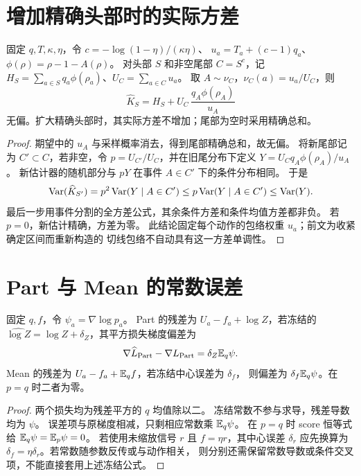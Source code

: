 \section{增加精确头部时的实际方差}
\begin{proposition}[固定包络尾采样的方差单调性]
\label{prop:head-monotone-variance}
固定 $q,T,\kappa,\eta$，令 $c=-\log(1-\eta)/(\kappa\eta)$、
$u_a=T_a+(c-1)q_a$、$\phi(\rho)=\rho-1-A(\rho)$。
对头部 $S$ 和非空尾部 $C=S^c$，记
$H_S=\sum_{a\in S}q_a\phi(\rho_a)$、$U_C=\sum_{a\in C}u_a$。
取 $A\sim\nu_C$，$\nu_C(a)=u_a/U_C$，则
\begin{equation}
\widehat K_S=H_S+U_C\,\frac{q_A\phi(\rho_A)}{u_A}
\end{equation}
无偏。扩大精确头部时，其实际方差不增加；尾部为空时采用精确总和。
\end{proposition}
\begin{proof}
期望中的 $u_A$ 与采样概率消去，得到尾部精确总和，故无偏。
将新尾部记为 $C'\subset C$，若非空，令
$p=U_{C'}/U_C$，并在旧尾分布下定义
$Y=U_Cq_A\phi(\rho_A)/u_A$。
新估计器的随机部分与 $pY$ 在事件 $A\in C'$ 下的条件分布相同。
于是
\begin{equation}
\operatorname{Var}(\widehat K_{S'})
=p^2\operatorname{Var}(Y\mid A\in C')
\le p\operatorname{Var}(Y\mid A\in C')
\le\operatorname{Var}(Y).
\end{equation}
最后一步用事件分割的全方差公式，其余条件方差和条件均值方差都非负。
若 $p=0$，新估计精确，方差为零。
此结论固定每个动作的包络权重 $u_a$；前文为收紧确定区间而重新构造的
切线包络不自动具有这一方差单调性。
\end{proof}

\section{Part 与 Mean 的常数误差}
\begin{proposition}[配分函数及信号中心误差的精确梯度偏差]
\label{prop:part-mean-error}
固定 $q,f$，令 $\psi_a=\nabla\log p_a$。
Part 的残差为 $U_a-f_a+\log Z$，若冻结的
$\widehat{\log Z}=\log Z+\delta_Z$，其平方损失梯度偏差为
\begin{equation}
\nabla\widehat L_{\rm Part}-\nabla L_{\rm Part}
=\delta_Z\mathbb E_q\psi.
\end{equation}
Mean 的残差为 $U_a-f_a+\mathbb E_qf$，若冻结中心误差为 $\delta_f$，
则偏差为 $\delta_f\mathbb E_q\psi$。在 $p=q$ 时二者为零。
\end{proposition}
\begin{proof}
两个损失均为残差平方的 $q$ 均值除以二。
冻结常数不参与求导，残差导数均为 $\psi$。
误差项与原梯度相减，只剩相应常数乘 $\mathbb E_q\psi$。
在 $p=q$ 时 score 恒等式给 $\mathbb E_q\psi=\mathbb E_p\psi=0$。
若使用未缩放信号 $r$ 且 $f=\eta r$，其中心误差 $\delta_r$
应先换算为 $\delta_f=\eta\delta_r$。若常数随参数反传或与动作相关，
则分别还需保留常数导数或条件交叉项，不能直接套用上述冻结公式。
\end{proof}
